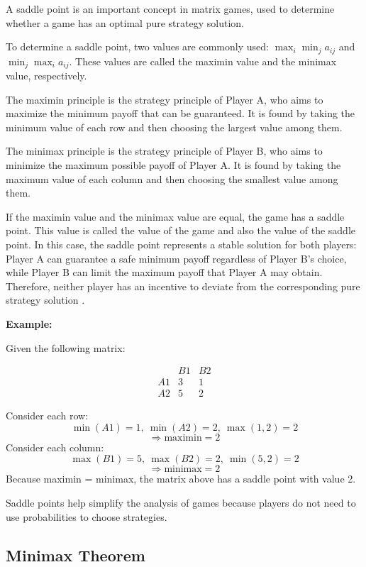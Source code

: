 \documentclass[12pt,a4paper]{article}
\begin{document}
A saddle point is an important concept in matrix games, used to determine whether a game has an optimal pure strategy solution.

To determine a saddle point, two values are commonly used: \(\max_i \min_j a_{ij}\) and \(\min_j \max_i a_{ij}\). These values are called the maximin value and the minimax value, respectively.

The maximin principle is the strategy principle of Player A, who aims to maximize the minimum payoff that can be guaranteed. It is found by taking the minimum value of each row and then choosing the largest value among them.

The minimax principle is the strategy principle of Player B, who aims to minimize the maximum possible payoff of Player A. It is found by taking the maximum value of each column and then choosing the smallest value among them.

If the maximin value and the minimax value are equal, the game has a saddle point. This value is called the value of the game and also the value of the saddle point. In this case, the saddle point represents a stable solution for both players: Player A can guarantee a safe minimum payoff regardless of Player B's choice, while Player B can limit the maximum payoff that Player A may obtain. Therefore, neither player has an incentive to deviate from the corresponding pure strategy solution \cite{murthy2007}.


\textbf{Example:}

Given the following matrix:

\begingroup
\small
\renewcommand{\arraystretch}{0.75}
\setlength{\arraycolsep}{4pt}
\[
\begin{array}{c|cc}
 & B1 & B2\\
\hline
A1 & 3 & 1 \\
A2 & 5 & 2
\end{array}
\]
\endgroup

Consider each row: 
\[
\min(A1)=1,\ \min(A2)=2, \ \max(1,2)=2
\]
\[
\Rightarrow \text{maximin}=2
\]
Consider each column: 
\[
\max(B1)=5, \ \max(B2)=2,\ \min(5,2)=2
\]
\[
\Rightarrow \text{minimax}=2
\]
Because maximin = minimax, the matrix above has a saddle point with value 2.

Saddle points help simplify the analysis of games because players do not need to use probabilities to choose strategies.




\subsection{Minimax Theorem}
\end{document}
